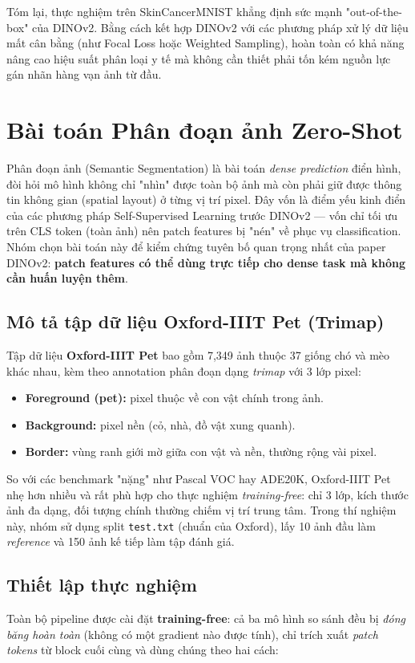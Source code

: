 Tóm lại, thực nghiệm trên SkinCancerMNIST khẳng định sức mạnh "out-of-the-box" của DINOv2. Bằng cách kết hợp DINOv2 với các phương pháp xử lý dữ liệu mất cân bằng (như Focal Loss hoặc Weighted Sampling), hoàn toàn có khả năng nâng cao hiệu suất phân loại y tế mà không cần thiết phải tốn kém nguồn lực gán nhãn hàng vạn ảnh từ đầu.

\section{Bài toán Phân đoạn ảnh Zero-Shot}

Phân đoạn ảnh (Semantic Segmentation) là bài toán \textit{dense prediction} điển hình, đòi hỏi mô hình không chỉ "nhìn" được toàn bộ ảnh mà còn phải giữ được thông tin không gian (spatial layout) ở từng vị trí pixel. Đây vốn là điểm yếu kinh điển của các phương pháp Self-Supervised Learning trước DINOv2 — vốn chỉ tối ưu trên CLS token (toàn ảnh) nên patch features bị "nén" về phục vụ classification. Nhóm chọn bài toán này để kiểm chứng tuyên bố quan trọng nhất của paper DINOv2: \textbf{patch features có thể dùng trực tiếp cho dense task mà không cần huấn luyện thêm}.

\subsection{Mô tả tập dữ liệu Oxford-IIIT Pet (Trimap)}
Tập dữ liệu \textbf{Oxford-IIIT Pet} bao gồm 7,349 ảnh thuộc 37 giống chó và mèo khác nhau, kèm theo annotation phân đoạn dạng \textit{trimap} với 3 lớp pixel:
\begin{itemize}
    \item \textbf{Foreground (pet):} pixel thuộc về con vật chính trong ảnh.
    \item \textbf{Background:} pixel nền (cỏ, nhà, đồ vật xung quanh).
    \item \textbf{Border:} vùng ranh giới mờ giữa con vật và nền, thường rộng vài pixel.
\end{itemize}
So với các benchmark "nặng" như Pascal VOC hay ADE20K, Oxford-IIIT Pet nhẹ hơn nhiều và rất phù hợp cho thực nghiệm \textit{training-free}: chỉ 3 lớp, kích thước ảnh đa dạng, đối tượng chính thường chiếm vị trí trung tâm. Trong thí nghiệm này, nhóm sử dụng split \texttt{test.txt} (chuẩn của Oxford), lấy 10 ảnh đầu làm \textit{reference} và 150 ảnh kế tiếp làm tập đánh giá.

\subsection{Thiết lập thực nghiệm}
Toàn bộ pipeline được cài đặt \textbf{training-free}: cả ba mô hình so sánh đều bị \textit{đóng băng hoàn toàn} (không có một gradient nào được tính), chỉ trích xuất \textit{patch tokens} từ block cuối cùng và dùng chúng theo hai cách:

